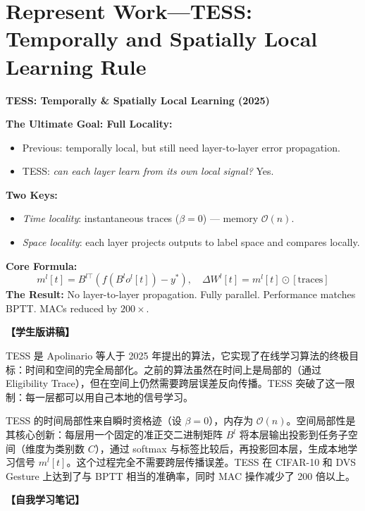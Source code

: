 \documentclass[journal,12pt,onecolumn]{IEEEtran}
\begin{document}
\section{Represent Work—TESS: Temporally and Spatially Local Learning Rule}

\bigskip\noindent\textbf{TESS: Temporally \& Spatially Local Learning (2025)}\par\smallskip
\textbf{The Ultimate Goal: Full Locality:}
\begin{itemize}
    \item Previous: temporally local, but still need layer-to-layer error propagation.
    \item TESS: \textit{can each layer learn from its own local signal?} Yes.
\end{itemize}
\textbf{Two Keys:}
\begin{itemize}
    \item \textit{Time locality}: instantaneous traces ($\beta=0$) — memory $\mathcal{O}(n)$.
    \item \textit{Space locality}: each layer projects outputs to label space and compares locally.
\end{itemize}
\textbf{Core Formula:}
\begin{equation}
    m^l[t] = B^{l\top}(f(B^l o^l[t]) - y^*), \quad \Delta W^l[t] = m^l[t] \odot [\text{traces}]
\end{equation}
\textbf{The Result:} No layer-to-layer propagation. Fully parallel. Performance matches BPTT. MACs reduced by $200\times$.

\textbf{【学生版讲稿】}

TESS 是 Apolinario 等人于 2025 年提出的算法，它实现了在线学习算法的终极目标：时间和空间的完全局部化。之前的算法虽然在时间上是局部的（通过 Eligibility Trace），但在空间上仍然需要跨层误差反向传播。TESS 突破了这一限制：每一层都可以用自己本地的信号学习。

TESS 的时间局部性来自瞬时资格迹（设 $\beta=0$），内存为 $\mathcal{O}(n)$。空间局部性是其核心创新：每层用一个固定的准正交二进制矩阵 $B^l$ 将本层输出投影到任务子空间（维度为类别数 $C$），通过 softmax 与标签比较后，再投影回本层，生成本地学习信号 $m^l[t]$。这个过程完全不需要跨层传播误差。TESS 在 CIFAR-10 和 DVS Gesture 上达到了与 BPTT 相当的准确率，同时 MAC 操作减少了 200 倍以上。

\bigskip\noindent\textbf{【自我学习笔记】}
\end{document}

